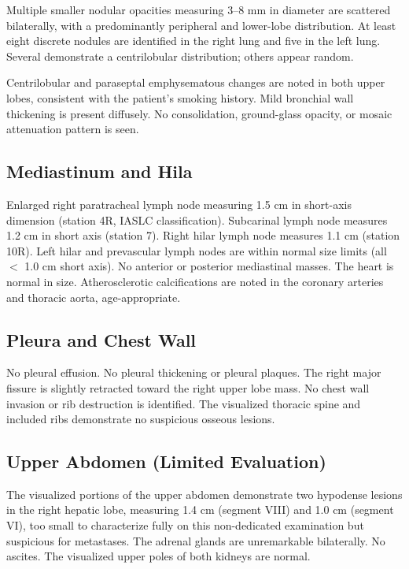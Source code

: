 \documentclass[11pt]{article}
\begin{document}
Multiple smaller nodular opacities measuring 3--8 mm in diameter are scattered bilaterally, with a predominantly peripheral and lower-lobe distribution. At least eight discrete nodules are identified in the right lung and five in the left lung. Several demonstrate a centrilobular distribution; others appear random.

Centrilobular and paraseptal emphysematous changes are noted in both upper lobes, consistent with the patient's smoking history. Mild bronchial wall thickening is present diffusely. No consolidation, ground-glass opacity, or mosaic attenuation pattern is seen.

\subsection{Mediastinum and Hila}

Enlarged right paratracheal lymph node measuring 1.5 cm in short-axis dimension (station 4R, IASLC classification). Subcarinal lymph node measures 1.2 cm in short axis (station 7). Right hilar lymph node measures 1.1 cm (station 10R). Left hilar and prevascular lymph nodes are within normal size limits (all $<$ 1.0 cm short axis). No anterior or posterior mediastinal masses. The heart is normal in size. Atherosclerotic calcifications are noted in the coronary arteries and thoracic aorta, age-appropriate.

\subsection{Pleura and Chest Wall}

No pleural effusion. No pleural thickening or pleural plaques. The right major fissure is slightly retracted toward the right upper lobe mass. No chest wall invasion or rib destruction is identified. The visualized thoracic spine and included ribs demonstrate no suspicious osseous lesions.

\subsection{Upper Abdomen (Limited Evaluation)}

The visualized portions of the upper abdomen demonstrate two hypodense lesions in the right hepatic lobe, measuring 1.4 cm (segment VIII) and 1.0 cm (segment VI), too small to characterize fully on this non-dedicated examination but suspicious for metastases. The adrenal glands are unremarkable bilaterally. No ascites. The visualized upper poles of both kidneys are normal.
\end{document}

